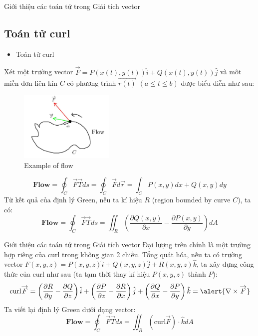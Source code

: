 \documentclass[8pt]{beamer}
\begin{document}
\begin{frame}{Giới thiệu các toán tử trong Giải tích vector}
\subsection{Toán tử curl}
\begin{itemize}
	\item Toán tử curl
\end{itemize}
Xét một trường vector $\overrightarrow{F}=P(x(t),y(t))\hat i+Q(x(t),y(t))\hat j$ và môt miền đơn liên kín $C$ có phương trình $\overrightarrow{r(t)}$ $(a\leq t\leq b)$ được biểu diễn như sau:
\begin{figure}[h]
			\includegraphics[width=0.4\textwidth]{flow.jpg}
			\caption{Example of flow}			\label{fig:re3}
\end{figure}
\begin{equation*}
	\textbf{Flow}=	\oint_{C}\overrightarrow{F}\overrightarrow{T}ds=\oint_{C}\overrightarrow{F}d\overrightarrow{r}=\int_{C}P(x,y)dx+Q(x,y)dy
\end{equation*}
Từ kết quả của định lý Green, nếu ta kí hiệu $R$ (region bounded by curve $C$), ta có:
$$\textbf{Flow}=\oint_{C}\overrightarrow{F}\overrightarrow{T}ds=\iint_{R}\left(\frac{\partial Q(x,y)}{\partial x}-\frac{\partial P(x,y)}{\partial y}\right)dA$$
\end{frame}
\begin{frame}{Giới thiệu các toán tử trong Giải tích vector}
Đại lượng trên chính là một trường hợp riêng của curl trong không gian 2 chiều. Tổng quát hóa, nếu ta có trường vector $F(x,y,z)=P(x,y,z)\hat i + Q(x,y,z)\hat j + R(x,y,z)\hat k$, ta xây dựng công thức của curl như sau (ta tạm thời thay kí hiệu $P(x,y,z)$ thành $P$):
$$\text{curl}\overrightarrow{F}=\left(\frac{\partial R}{\partial y}-\frac{\partial Q}{\partial z}\right)\hat i+\left(\frac{\partial P}{\partial z}-\frac{\partial R}{\partial x}\right)\hat j+\left(\frac{\partial Q}{\partial x}-\frac{\partial P}{\partial y}\right)\hat k=\alert{\nabla \times \overrightarrow{F}}$$
Ta viết lại định lý Green dưới dạng vector:
$$\textbf{Flow}=\oint_{C}\overrightarrow{F}\overrightarrow{T}ds=\iint_{R}(\text{curl} \overrightarrow{F})\cdot \hat k dA$$
\end{frame}
\end{document}
